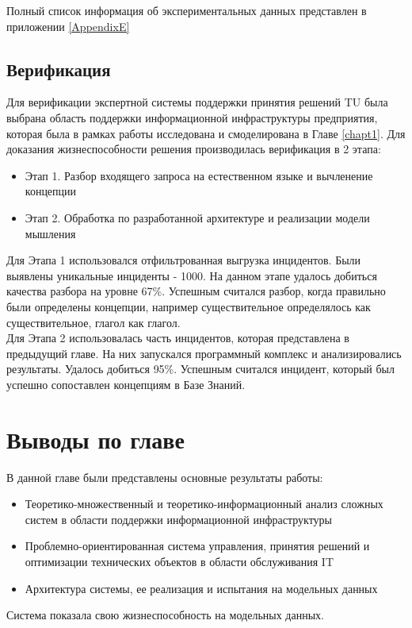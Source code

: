 Полный список информация об экспериментальных данных представлен в приложении \ref{AppendixE}
\clearpage
\subsection{Верификация}
Для верификации экспертной системы поддержки принятия решений TU была выбрана область поддержки информационной инфраструктуры предприятия, которая была в рамках работы исследована и смоделирована в Главе \ref{chapt1}. 
Для доказания жизнеспособности решения производилась верификация в 2 этапа:
\begin{itemize}
	\item Этап 1. Разбор входящего запроса на естественном языке и вычленение концепции
	\item Этап 2. Обработка по разработанной архитектуре и реализации модели мышления  
\end{itemize}
Для Этапа 1 использовался отфильтрованная выгрузка инцидентов. Были выявлены уникальные инциденты - 1000. На данном этапе удалось добиться качества разбора на уровне 67\%. Успешным считался разбор, когда правильно были определены концепции, например существительное определялось как существительное, глагол как глагол. \\
Для Этапа 2 использовалась часть инцидентов, которая представлена в предыдущий главе. На них запускался программный комплекс и анализировались результаты. Удалось добиться 95\%. Успешным считался инцидент, который был успешно сопоставлен концепциям в Базе Знаний.\\
\clearpage
\section{Выводы по главе}
В данной главе были представлены основные результаты работы:
\begin{itemize}
	\item Теоретико-множественный и теоретико-информационный анализ сложных систем в области поддержки информационной инфраструктуры
	\item Проблемно-ориентированная система управления, принятия решений и оптимизации технических объектов в области обслуживания IT
	\item Архитектура системы, ее реализация и испытания на модельных данных
\end{itemize}
Система показала свою жизнеспособность на модельных данных. 


\clearpage